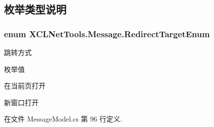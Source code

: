 \subsection{枚举类型说明}
\hypertarget{namespace_x_c_l_net_tools_1_1_message_a7f19b509275317a7b01e7dc5cb615095}{
\subsubsection[{Redirect\-Target\-Enum}]{\setlength{\rightskip}{0pt plus 5cm}enum {\bf X\-C\-L\-Net\-Tools.\-Message.\-Redirect\-Target\-Enum}}}\label{namespace_x_c_l_net_tools_1_1_message_a7f19b509275317a7b01e7dc5cb615095}


跳转方式 

\begin{Desc}
\item[枚举值]\par
\begin{description}
\item[{\em 
\hypertarget{namespace_x_c_l_net_tools_1_1_message_a7f19b509275317a7b01e7dc5cb615095a6adf97f83acf6453d4a6a4b1070f3754}{None}\label{namespace_x_c_l_net_tools_1_1_message_a7f19b509275317a7b01e7dc5cb615095a6adf97f83acf6453d4a6a4b1070f3754}
}]在当前页打开 \item[{\em 
\hypertarget{namespace_x_c_l_net_tools_1_1_message_a7f19b509275317a7b01e7dc5cb615095aa9453646c9602d8a4f00d42b7c9844ab}{New\-Blank}\label{namespace_x_c_l_net_tools_1_1_message_a7f19b509275317a7b01e7dc5cb615095aa9453646c9602d8a4f00d42b7c9844ab}
}]新窗口打开 \end{description}
\end{Desc}


在文件 Message\-Model.\-cs 第 96 行定义.

